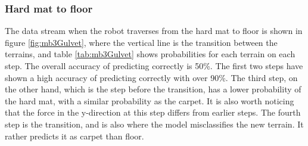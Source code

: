 \documentclass[USenglish]{ifimaster}  %
\begin{document}
	
	\begin{table}[h]
		\centering
		\caption[Results of transistion from floor to carpet]{Estimated probability of each terrain per step from floor to carpet. Values are marked green to represent correct predictions. For incorrect predictions, the actual value is marked yellow while the predicted value is marked red.}
		\label{tab:Gulvet4teppe}
	\end{table}
	\FloatBarrier
	\clearpage
	
\subsubsection{Hard mat to floor} \label{subsec:hmf}
The data stream when the robot traverses from the hard mat to floor is shown in figure \ref{fig:mb3Gulvet}, where the vertical line is the transition between the terrains, and table \ref{tab:mb3Gulvet} shows probabilities for each terrain on each step. The overall accuracy of predicting correctly is 50\%. The first two steps have shown a high accuracy of predicting correctly with over 90\%. The third step, on the other hand, which is the step before the transition, has a lower probability of the hard mat, with a similar probability as the carpet. It is also worth noticing that the force in the y-direction at this step differs from earlier steps. The fourth step is the transition, and is also where the model misclassifies the new terrain. It rather predicts it as carpet than floor.
		
\end{document}
